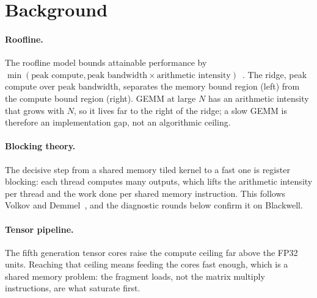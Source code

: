 \section{Background}

\paragraph{Roofline.} The roofline model bounds attainable performance by
$\min(\text{peak compute}, \text{peak bandwidth} \times \text{arithmetic
intensity})$~\cite{williams2009}. The ridge, peak compute over peak bandwidth,
separates the memory bound region (left) from the compute bound region (right).
GEMM at large $N$ has an arithmetic intensity that grows with $N$, so it lives far
to the right of the ridge; a slow GEMM is therefore an implementation gap, not an
algorithmic ceiling.

\paragraph{Blocking theory.} The decisive step from a shared memory tiled kernel
to a fast one is register blocking: each thread computes many outputs, which lifts
the arithmetic intensity per thread and the work done per shared memory
instruction. This follows Volkov and Demmel~\cite{volkov2008}, and the diagnostic
rounds below confirm it on Blackwell.

\paragraph{Tensor pipeline.} The fifth generation tensor cores raise the compute
ceiling far above the FP32 units. Reaching that ceiling means feeding the cores
fast enough, which is a shared memory problem: the fragment loads, not the matrix
multiply instructions, are what saturate first.
